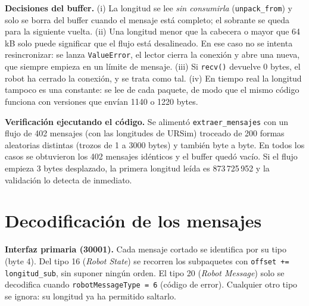\documentclass[10pt,a4paper]{article}
\newcommand{\code}[1]{\texttt{\small #1}}
\begin{document}
\vspace{-6pt}
\textbf{Decisiones del buffer.} (i) La longitud se lee \emph{sin consumirla} (\code{unpack\_from}) y solo se borra del buffer cuando el mensaje está completo; el sobrante se queda para la siguiente vuelta. (ii) Una longitud menor que la cabecera o mayor que 64\,kB solo puede significar que el flujo está desalineado. En ese caso no se intenta resincronizar: se lanza \code{ValueError}, el lector cierra la conexión y abre una nueva, que siempre empieza en un límite de mensaje. (iii) Si \code{recv()} devuelve 0 bytes, el robot ha cerrado la conexión, y se trata como tal. (iv) En tiempo real la longitud tampoco es una constante: se lee de cada paquete, de modo que el mismo código funciona con versiones que envían 1140 o 1220 bytes.

\textbf{Verificación ejecutando el código.} Se alimentó \code{extraer\_mensajes} con un flujo de 402 mensajes (con las longitudes de URSim) troceado de 200 formas aleatorias distintas (trozos de 1 a 3000 bytes) y también byte a byte. En todos los casos se obtuvieron los 402 mensajes idénticos y el buffer quedó vacío. Si el flujo empieza 3 bytes desplazado, la primera longitud leída es 873\,725\,952 y la validación lo detecta de inmediato.

\section{Decodificación de los mensajes}

\textbf{Interfaz primaria (30001).} Cada mensaje cortado se identifica por su tipo (byte 4). Del tipo 16 (\emph{Robot State}) se recorren los subpaquetes con \code{offset += longitud\_sub}, sin suponer ningún orden. El tipo 20 (\emph{Robot Message}) solo se decodifica cuando \code{robotMessageType = 6} (código de error). Cualquier otro tipo se ignora: su longitud ya ha permitido saltarlo.
\end{document}
